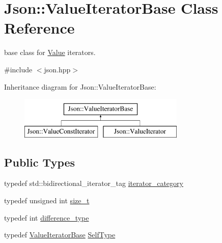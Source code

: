 \hypertarget{classJson_1_1ValueIteratorBase}{}\section{Json\+:\+:Value\+Iterator\+Base Class Reference}
\label{classJson_1_1ValueIteratorBase}


base class for \hyperlink{classJson_1_1Value}{Value} iterators.  




{\ttfamily \#include $<$json.\+hpp$>$}

Inheritance diagram for Json\+:\+:Value\+Iterator\+Base\+:\begin{figure}[H]
\begin{center}
\leavevmode
\includegraphics[height=2.000000cm]{classJson_1_1ValueIteratorBase}
\end{center}
\end{figure}
\subsection*{Public Types}
\begin{DoxyCompactItemize}
\item 
typedef std\+::bidirectional\+\_\+iterator\+\_\+tag \hyperlink{classJson_1_1ValueIteratorBase_a02fd11a4fbdc0007da1e8bcf5e6b83c3}{iterator\+\_\+category}
\item 
typedef unsigned int \hyperlink{classJson_1_1ValueIteratorBase_a9d3a3c7ce5cdefe23cb486239cf07bb5}{size\+\_\+t}
\item 
typedef int \hyperlink{classJson_1_1ValueIteratorBase_a4e44bf8cbd17ec8d6e2c185904a15ebd}{difference\+\_\+type}
\item 
typedef \hyperlink{classJson_1_1ValueIteratorBase}{Value\+Iterator\+Base} \hyperlink{classJson_1_1ValueIteratorBase_a9d2a940d03ea06d20d972f41a89149ee}{Self\+Type}
\end{DoxyCompactItemize}
